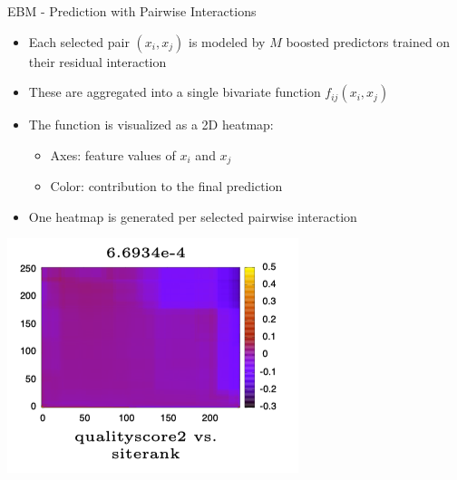 \documentclass[11pt,compress,t,notes=noshow, aspectratio=169, xcolor=table]{beamer}
\begin{document}



\begin{frame}{EBM - Prediction with Pairwise Interactions}
\begin{itemize}
    \item Each selected pair $(x_i, x_j)$ is modeled by $M$ boosted predictors trained on their residual interaction
    \item These are aggregated into a single bivariate function $f_{ij}(x_i, x_j)$
    \item The function is visualized as a 2D heatmap: 
    \begin{itemize}
        \item Axes: feature values of $x_i$ and $x_j$
        \item Color: contribution to the final prediction
    \end{itemize}
    \item One heatmap is generated per selected pairwise interaction
\end{itemize}

\vspace{0.3cm}
\centering
\includegraphics[width=0.42\linewidth]{figure/3D Heatmap.png}
\end{frame}
\end{document}
